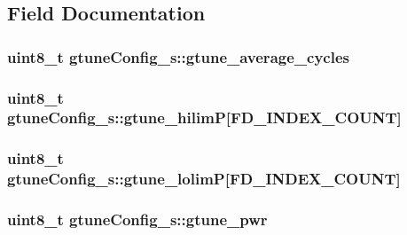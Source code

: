 \subsection{Field Documentation}
\hypertarget{structgtuneConfig__s_a1c3f18b7d759297863b37e0896fcd343}{
\subsubsection[{gtune\+\_\+average\+\_\+cycles}]{\setlength{\rightskip}{0pt plus 5cm}uint8\+\_\+t gtune\+Config\+\_\+s\+::gtune\+\_\+average\+\_\+cycles}}\label{structgtuneConfig__s_a1c3f18b7d759297863b37e0896fcd343}
\hypertarget{structgtuneConfig__s_abee4333fa0c23a838f8e2909c12e8470}{
\subsubsection[{gtune\+\_\+hilim\+P}]{\setlength{\rightskip}{0pt plus 5cm}uint8\+\_\+t gtune\+Config\+\_\+s\+::gtune\+\_\+hilim\+P\mbox{[}{\bf F\+D\+\_\+\+I\+N\+D\+E\+X\+\_\+\+C\+O\+U\+N\+T}\mbox{]}}}\label{structgtuneConfig__s_abee4333fa0c23a838f8e2909c12e8470}
\hypertarget{structgtuneConfig__s_a0ba693c38d653cd05cccc7de4745f6a0}{
\subsubsection[{gtune\+\_\+lolim\+P}]{\setlength{\rightskip}{0pt plus 5cm}uint8\+\_\+t gtune\+Config\+\_\+s\+::gtune\+\_\+lolim\+P\mbox{[}{\bf F\+D\+\_\+\+I\+N\+D\+E\+X\+\_\+\+C\+O\+U\+N\+T}\mbox{]}}}\label{structgtuneConfig__s_a0ba693c38d653cd05cccc7de4745f6a0}
\hypertarget{structgtuneConfig__s_ac4d72215fa2899f8647adc91da057fb5}{
\subsubsection[{gtune\+\_\+pwr}]{\setlength{\rightskip}{0pt plus 5cm}uint8\+\_\+t gtune\+Config\+\_\+s\+::gtune\+\_\+pwr}}\label{structgtuneConfig__s_ac4d72215fa2899f8647adc91da057fb5}
